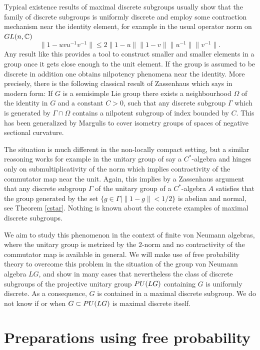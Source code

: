 \documentclass[11pt]{amsproc}
\theoremstyle{plain}
\theoremstyle{remark}
\begin{document}
Typical existence results of maximal discrete subgroups usually show that the family of discrete subgroups is uniformly discrete and employ some contraction mechanism near the identity element, for example in the usual operator norm on ${\rm GL}(n,\mathbb C)$
$$\|1-uvu^{-1}v^{-1}\| \leq 2 \|1-u\| \|1-v\| \|u^{-1}\| \|v^{-1}\|.$$  
Any result like this provides a tool to construct smaller and smaller elements in a group once it gets close enough to the unit element. If the group is assumed to be discrete in addition one obtains nilpotency phenomena near the identity. More precisely, there is the following classical result of Zassenhaus \cite{MR3069692} which says in modern form: If $G$ is a semisimple Lie group there exists a neighbourhood $\Omega$ of the identity in $G$ and a constant $C > 0$, such that any discrete subgroup $\Gamma$ which is generated by $\Gamma \cap \Omega$ contains a nilpotent subgroup of index bounded by $C$. This has been generalized by Margulis to cover isometry groups of spaces of negative sectional curvature.

The situation is much different in the non-locally compact setting, but a similar reasoning works for example in the unitary group of say a $C^*$-algebra and hinges only on submultiplicativity of the norm which implies contractivity of the commutator map near the unit. Again, this implies by a Zassenhaus argument that any discrete subgroup $\Gamma$ of the unitary group of a $C^*$-algebra $A$ satisfies that the group generated by the set
$\{g \in \Gamma \mid \|1-g\|<1/2 \}$ is abelian and normal, see Theorem \ref{cstar}. Nothing is known about the concrete examples of maximal discrete subgroups.

We aim to study this phenomenon in the context of finite von Neumann algebras, where the unitary group is metrized by the $2$-norm and no contractivity of the commutator map is available in general. We will make use of free probability theory to overcome this problem in the situation of the group von Neumann algebra $LG$, and show in many cases that nevertheless the class of discrete subgroups of the projective unitary group ${\rm PU}(LG)$ containing $G$ is uniformly discrete. As a consequence, $G$ is contained in a maximal discrete subgroup. We do not know if or when $G \subset {\rm PU}(LG)$ is maximal discrete itself.



\section{Preparations using free probability}
\end{document}
